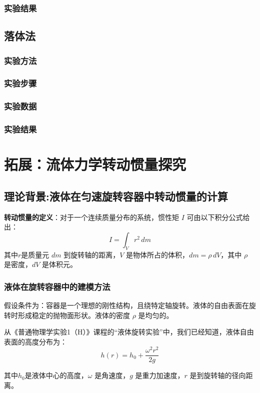 \documentclass[12pt,hyperref,a4paper,UTF8]{ctexart}
\begin{document}
\subsubsection{实验结果}


\subsection{落体法}
\subsubsection{实验方法}

\subsubsection{实验步骤}

\subsubsection{实验数据}

\subsubsection{实验结果}


\section{拓展：流体力学转动惯量探究}
\subsection{理论背景:液体在匀速旋转容器中转动惯量的计算}
\textbf{转动惯量的定义}：对于一个连续质量分布的系统，惯性矩 $I$ 可由以下积分公式给出：  
$$
I = \int_V r^2 \,dm
$$  
其中$r$是质量元 $dm$ 到旋转轴的距离，$V$ 是物体所占的体积，$dm = \rho \, dV$，其中 $\rho$ 是密度，$dV$ 是体积元。

\subsubsection{液体在旋转容器中的建模方法}

假设条件为：容器是一个理想的刚性结构，且绕特定轴旋转。液体的自由表面在旋转时形成稳定的抛物面形状。液体的密度 $\rho$ 是均匀的。

从《普通物理学实验1（H）》课程的“液体旋转实验”中，我们已经知道，液体自由表面的高度分布为： 
$$
h(r) = h_0 + \frac{\omega^2 r^2}{2g}
$$  

其中$h_0$是液体中心的高度，$\omega$ 是角速度，$g$ 是重力加速度，$r$ 是到旋转轴的径向距离。
\end{document}

